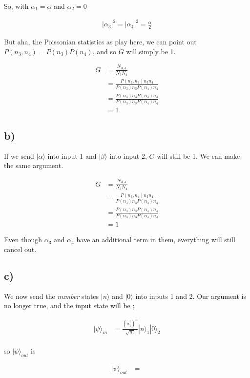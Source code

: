 \documentclass{article}
\newcommand{\bra}[1]{|#1\rangle}
\begin{document}
So, with $\alpha_1=\alpha$ and $\alpha_2=0$

\begin{align*}
    |\alpha_3|^2=|\alpha_4|^2=\frac{\alpha}{2}
\end{align*}

But aha, the Poissonian statistics as play here, we can point out $P(n_3,n_4)=P(n_3)P(n_4)$, and so $G$ will simply be 1.

\begin{align*}
    G&=\frac{N_{3,4}}{N_3N_4}\\[1em]
    &=\frac{P(n_3,n_4)n_3n_4}{P(n_3)n_3P(n_4)n_4}\\[1em]
    &=\frac{P(n_3)n_3P(n_4)n_4}{P(n_3)n_3P(n_4)n_4}\\[1em]
    &=1
\end{align*}

\subsection*{b)}
If we send $\bra{\alpha}$ into input 1 and $\bra{\beta}$ into input 2, $G$ will still be 1. We can make the same argument.

\begin{align*}
    G&=\frac{N_{3,4}}{N_3N_4}\\[1em]
    &=\frac{P(n_3,n_4)n_3n_4}{P(n_3)n_3P(n_4)n_4}\\[1em]
    &=\frac{P(n_3)n_3P(n_4)n_4}{P(n_3)n_3P(n_4)n_4}\\[1em]
    &=1
\end{align*}

Even though $\alpha_3$ and $\alpha_4$ have an additional term in them, everything will still cancel out.

\subsection*{c)}
We now send the \textit{number} states $\bra{n}$ and $\bra{0}$ into inputs 1 and 2. Our argument is no longer true, and the input state will be ;

\begin{align*}
    \bra{\psi}_{in}&=\frac{(a_1^\dagger)^n}{\sqrt{n!}}\bra{n}_1\bra{0}_2\\[1em]
\end{align*}

so $\bra{\psi}_{out}$ is 

\begin{align*}
    \bra{\psi}_{out}&=\frac{}{}
\end{align*}
\end{document}
